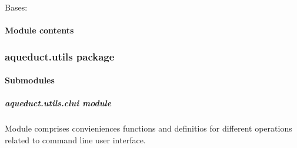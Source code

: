 \documentclass[a4paper,10pt,english]{sphinxmanual}
\begin{document}
\begin{fulllineitems}
\label{aqueduct.traj.selections:aqueduct.traj.selections.CompactSelectionMDA}
Bases: \href{https://docs.python.org/2/library/functions.html\#object}{}

\begin{fulllineitems}
\label{aqueduct.traj.selections:aqueduct.traj.selections.CompactSelectionMDA.__init__}
\end{fulllineitems}


\begin{fulllineitems}
\label{aqueduct.traj.selections:aqueduct.traj.selections.CompactSelectionMDA.toSelectionMDA}
\end{fulllineitems}


\end{fulllineitems}



\paragraph{Module contents}
\label{aqueduct.traj:module-aqueduct.traj}\label{aqueduct.traj:module-contents}

\subsubsection{aqueduct.utils package}
\label{aqueduct.utils:aqueduct-utils-package}\label{aqueduct.utils::doc}

\paragraph{Submodules}
\label{aqueduct.utils:submodules}

\subparagraph{aqueduct.utils.clui module}
\label{aqueduct.utils.clui::doc}\label{aqueduct.utils.clui:aqueduct-utils-clui-module}\label{aqueduct.utils.clui:module-aqueduct.utils.clui}
Module comprises convieniences functions and definitios for different operations related to command line user interface.
\end{document}
